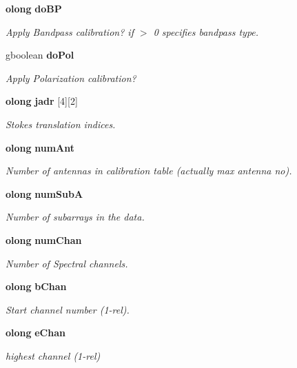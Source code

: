 \begin{CompactItemize}
{\bf olong} {\bf do\-BP}
\begin{CompactList}\small\item\em Apply Bandpass calibration? if $>$ 0 specifies bandpass type. \item\end{CompactList}\item 
gboolean {\bf do\-Pol}
\begin{CompactList}\small\item\em Apply Polarization calibration? \item\end{CompactList}\item 
{\bf olong} {\bf jadr} [4][2]
\begin{CompactList}\small\item\em Stokes translation indices. \item\end{CompactList}\item 
{\bf olong} {\bf num\-Ant}
\begin{CompactList}\small\item\em Number of antennas in calibration table (actually max antenna no). \item\end{CompactList}\item 
{\bf olong} {\bf num\-Sub\-A}
\begin{CompactList}\small\item\em Number of subarrays in the data. \item\end{CompactList}\item 
{\bf olong} {\bf num\-Chan}
\begin{CompactList}\small\item\em Number of Spectral channels. \item\end{CompactList}\item 
{\bf olong} {\bf b\-Chan}
\begin{CompactList}\small\item\em Start channel number (1-rel). \item\end{CompactList}\item 
{\bf olong} {\bf e\-Chan}
\begin{CompactList}\small\item\em highest channel (1-rel) \item\end{CompactList}\item 

\end{CompactItemize}
